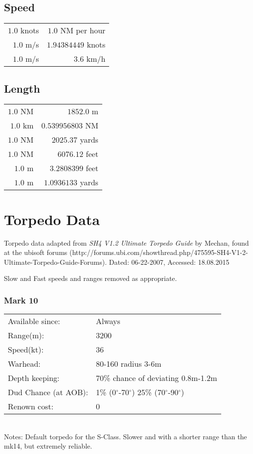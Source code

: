 \documentclass{article}
\newcommand{\degree}{$^{\circ}$}
\begin{document}
\subsection{Speed}
\begin{center}
\begin{tabular}{r | r}
$1.0$ knots & $1.0$ NM per hour\\
$1.0$ m/s & $1.94384449$ knots\\
$1.0$ m/s & $3.6$ km/h\\
\end{tabular}
\end{center}

\subsection{Length}
\begin{center}
\begin{tabular}{r | r}
$1.0$ NM & $1852.0$ m\\
$1.0$ km & $0.539956803$ NM\\
$1.0$ NM & $2025.37$ yards\\
$1.0$ NM & $6076.12$ feet\\
$1.0$ m & $3.2808399$ feet\\
$1.0$ m & $1.0936133$ yards\\
\end{tabular}
\end{center}

\section{Torpedo Data}

Torpedo data adapted from \emph{SH4 V1.2 Ultimate Torpedo Guide} by Mechan, found at the ubisoft forums (http://forums.ubi.com/showthread.php/475595-SH4-V1-2-Ultimate-Torpedo-Guide-Forums). Dated: 06-22-2007, Accessed: 18.08.2015

Slow and Fast speeds and ranges removed as appropriate.

\subsubsection{Mark 10}
\begin{tabular}{l|l}
Available since:& Always\\
Range(m):& 3200\\
Speed(kt):&36\\
Warhead:& 80-160 radius 3-6m\\
Depth keeping:& 70\% chance of deviating 0.8m-1.2m\\
Dud Chance (at AOB):& 1\% (0\degree -70\degree ) 25\% (70\degree-90\degree)\\
Renown cost:& 0\\
\end{tabular} \\
Notes: Default torpedo for the S-Class. Slower and with a shorter range than the mk14, but extremely reliable.\\
\end{document}
